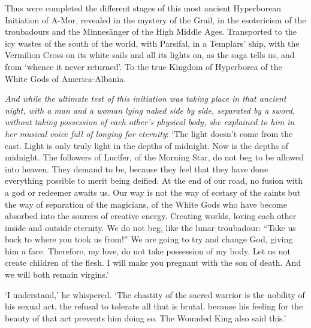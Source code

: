 \begin{quotationx}
Thus were completed the different stages of this most ancient Hyperborean Initiation of A-Mor, revealed in the mystery of the Grail, in the esotericism of the troubadours and the Minnesänger of the High Middle Ages. Transported to the icy wastes of the south of the world, with Parsifal, in a Templars' ship, with the Vermilion Cross on its white sails and all its lights on, as the saga tells us, and from `whence it never returned'. To the true Kingdom of Hyperborea of the White Gods of America-Albania.

\emph{And while the ultimate test of this initiation was taking place in that ancient night, with a man and a woman lying naked side by side, separated by a sword, without taking possession of each other's physical body, she explained to him in her musical voice full of longing for eternity}: `The light doesn't come from the east. Light is only truly light in the depths of midnight. Now is the depths of midnight. The followers of Lucifer, of the Morning Star, do not beg to be allowed into heaven. They demand to be, because they feel that they have done everything possible to merit being deified. At the end of our road, no fusion with a god or redeemer awaits us. Our way is not the way of ecstasy of the saints but the way of separation of the magicians, of the White Gods who have become absorbed into the sources of creative energy. Creating worlds, loving each other inside and outside eternity. We do not beg, like the lunar troubadour: ``Take us back to where you took us from!'' We are going to try and change God, giving him a face. Therefore, my love, do not take possession of my body. Let us not create children of the flesh. I will make you pregnant with the son of death. And we will both remain virgins.'

`I understand,' he whispered. `The chastity of the sacred warrior is the nobility of his sexual act, the refusal to tolerate all that is brutal, because his feeling for the beauty of that act prevents him doing so. The Wounded King also said this.'


\end{quotationx}
